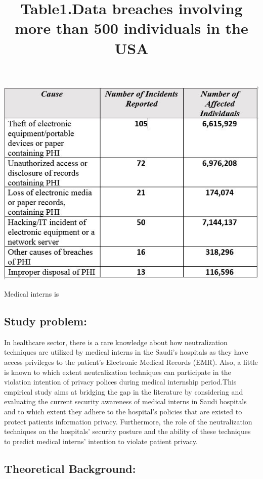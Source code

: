 \begin{center}
	\title{Table1.Data breaches involving more than 500 individuals in the USA \cite{OfficeofCivilRights2014} }
	\includegraphics [scale=1]{Data_Breach_table_2013_2014.JPG}
\end{center}
Medical interns is 

 \subsection{Study problem:}
In healthcare sector, there is a rare knowledge about how neutralization techniques are utilized by medical interns in the Saudi's hospitals as they have access privileges to the patient's Electronic Medical Records (EMR). Also, a little is known to which extent neutralization techniques can participate in the violation intention of privacy polices during medical internship period.This empirical study aims at bridging the gap in the literature by considering and evaluating the current security awareness of medical interns in Saudi hospitals and to which extent they adhere to the hospital's policies that are existed to protect patients information privacy. Furthermore, the role of the neutralization techniques on the hospitals' security posture and the ability of these techniques to predict medical interns' intention to violate patient privacy.

\subsection{Theoretical Background:}
